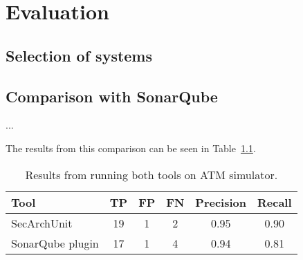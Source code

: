 \chapter{Evaluation}

\section{Selection of systems}

\section{Comparison with SonarQube}
...

The results from this comparison can be seen in Table~\ref{tab:results_comparison}.

\begin{table}
\begin{center}
\begin{tabular}{lccccc}
\hline
\textbf{Tool} & \textbf{TP} & \textbf{FP} & \textbf{FN} & \textbf{Precision} & \textbf{Recall}\\
\hline
SecArchUnit & 19 & 1 & 2 & 0.95 & 0.90\\
\rowcolor{RowColor}
SonarQube plugin & 17 & 1 & 4 & 0.94 & 0.81\\
\hline
\end{tabular}
\end{center}
\caption{Results from running both tools on ATM simulator.}
\label{tab:results_comparison}
\end{table}

